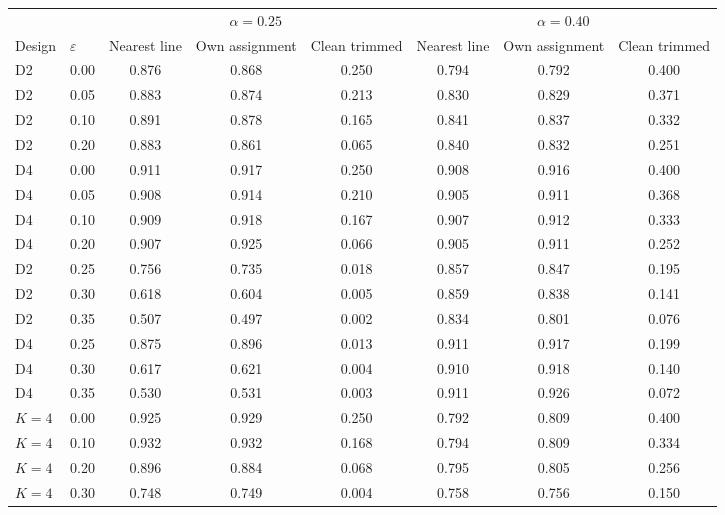 \begin{tabular}{llcccccc}
\toprule
 & & \multicolumn{3}{c}{$\alpha=0.25$} & \multicolumn{3}{c}{$\alpha=0.40$} \\
\cmidrule(lr){3-5}\cmidrule(lr){6-8}
Design & $\varepsilon$ & Nearest line & Own assignment & Clean trimmed & Nearest line & Own assignment & Clean trimmed \\
\midrule
D2 & 0.00 & 0.876 & 0.868 & 0.250 & 0.794 & 0.792 & 0.400 \\
D2 & 0.05 & 0.883 & 0.874 & 0.213 & 0.830 & 0.829 & 0.371 \\
D2 & 0.10 & 0.891 & 0.878 & 0.165 & 0.841 & 0.837 & 0.332 \\
D2 & 0.20 & 0.883 & 0.861 & 0.065 & 0.840 & 0.832 & 0.251 \\
D4 & 0.00 & 0.911 & 0.917 & 0.250 & 0.908 & 0.916 & 0.400 \\
D4 & 0.05 & 0.908 & 0.914 & 0.210 & 0.905 & 0.911 & 0.368 \\
D4 & 0.10 & 0.909 & 0.918 & 0.167 & 0.907 & 0.912 & 0.333 \\
D4 & 0.20 & 0.907 & 0.925 & 0.066 & 0.905 & 0.911 & 0.252 \\
D2 & 0.25 & 0.756 & 0.735 & 0.018 & 0.857 & 0.847 & 0.195 \\
D2 & 0.30 & 0.618 & 0.604 & 0.005 & 0.859 & 0.838 & 0.141 \\
D2 & 0.35 & 0.507 & 0.497 & 0.002 & 0.834 & 0.801 & 0.076 \\
D4 & 0.25 & 0.875 & 0.896 & 0.013 & 0.911 & 0.917 & 0.199 \\
D4 & 0.30 & 0.617 & 0.621 & 0.004 & 0.910 & 0.918 & 0.140 \\
D4 & 0.35 & 0.530 & 0.531 & 0.003 & 0.911 & 0.926 & 0.072 \\
$K=4$ & 0.00 & 0.925 & 0.929 & 0.250 & 0.792 & 0.809 & 0.400 \\
$K=4$ & 0.10 & 0.932 & 0.932 & 0.168 & 0.794 & 0.809 & 0.334 \\
$K=4$ & 0.20 & 0.896 & 0.884 & 0.068 & 0.795 & 0.805 & 0.256 \\
$K=4$ & 0.30 & 0.748 & 0.749 & 0.004 & 0.758 & 0.756 & 0.150 \\
\bottomrule
\end{tabular}